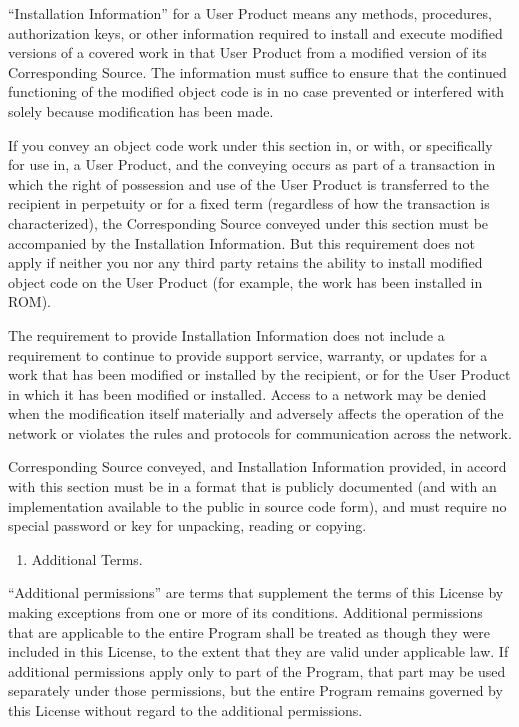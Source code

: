 \documentclass[letterpaper,10pt,english]{sphinxmanual}
\begin{document}
“Installation Information” for a User Product means any methods,
procedures, authorization keys, or other information required to install
and execute modified versions of a covered work in that User Product from
a modified version of its Corresponding Source.  The information must
suffice to ensure that the continued functioning of the modified object
code is in no case prevented or interfered with solely because
modification has been made.

If you convey an object code work under this section in, or with, or
specifically for use in, a User Product, and the conveying occurs as
part of a transaction in which the right of possession and use of the
User Product is transferred to the recipient in perpetuity or for a
fixed term (regardless of how the transaction is characterized), the
Corresponding Source conveyed under this section must be accompanied
by the Installation Information.  But this requirement does not apply
if neither you nor any third party retains the ability to install
modified object code on the User Product (for example, the work has
been installed in ROM).

The requirement to provide Installation Information does not include a
requirement to continue to provide support service, warranty, or updates
for a work that has been modified or installed by the recipient, or for
the User Product in which it has been modified or installed.  Access to a
network may be denied when the modification itself materially and
adversely affects the operation of the network or violates the rules and
protocols for communication across the network.

Corresponding Source conveyed, and Installation Information provided,
in accord with this section must be in a format that is publicly
documented (and with an implementation available to the public in
source code form), and must require no special password or key for
unpacking, reading or copying.
\begin{enumerate}
%
\setcounter{enumi}{6}
\item {} 
Additional Terms.

\end{enumerate}

“Additional permissions” are terms that supplement the terms of this
License by making exceptions from one or more of its conditions.
Additional permissions that are applicable to the entire Program shall
be treated as though they were included in this License, to the extent
that they are valid under applicable law.  If additional permissions
apply only to part of the Program, that part may be used separately
under those permissions, but the entire Program remains governed by
this License without regard to the additional permissions.
\end{document}

